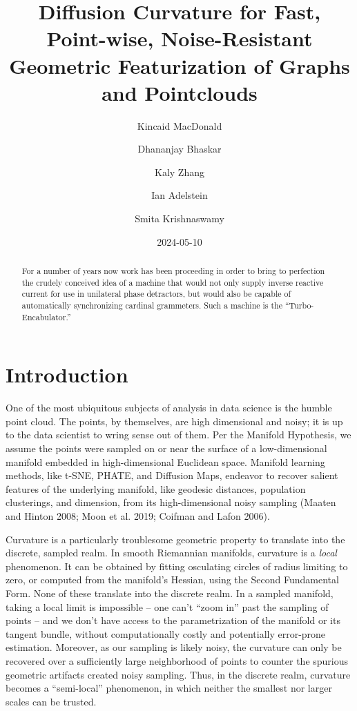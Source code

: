 \documentclass[
  letterpaper,
  DIV=11,
  numbers=noendperiod]{scrartcl}
\title{Diffusion Curvature for Fast, Point-wise, Noise-Resistant
Geometric Featurization of Graphs and Pointclouds}
\author{Kincaid MacDonald \and Dhananjay Bhaskar \and Kaly
Zhang \and Ian Adelstein \and Smita Krishnaswamy}
\date{2024-05-10}
\theoremstyle{plain}
\theoremstyle{plain}
\theoremstyle{definition}
\theoremstyle{definition}
\theoremstyle{remark}
\begin{document}
\maketitle
\begin{abstract}
For a number of years now work has been proceeding in order to bring to
perfection the crudely conceived idea of a machine that would not only
supply inverse reactive current for use in unilateral phase detractors,
but would also be capable of automatically synchronizing cardinal
grammeters. Such a machine is the ``Turbo-Encabulator.''
\end{abstract}

\section{Introduction}\label{introduction}

One of the most ubiquitous subjects of analysis in data science is the
humble point cloud. The points, by themselves, are high dimensional and
noisy; it is up to the data scientist to wring sense out of them. Per
the Manifold Hypothesis, we assume the points were sampled on or near
the surface of a low-dimensional manifold embedded in high-dimensional
Euclidean space. Manifold learning methods, like t-SNE, PHATE, and
Diffusion Maps, endeavor to recover salient features of the underlying
manifold, like geodesic distances, population clusterings, and
dimension, from its high-dimensional noisy sampling (Maaten and Hinton
2008; Moon et al. 2019; Coifman and Lafon 2006).

Curvature is a particularly troublesome geometric property to translate
into the discrete, sampled realm. In smooth Riemannian manifolds,
curvature is a \emph{local} phenomenon. It can be obtained by fitting
osculating circles of radius limiting to zero, or computed from the
manifold's Hessian, using the Second Fundamental Form. None of these
translate into the discrete realm. In a sampled manifold, taking a local
limit is impossible -- one can't ``zoom in'' past the sampling of points
-- and we don't have access to the parametrization of the manifold or
its tangent bundle, without computationally costly and potentially
error-prone estimation. Moreover, as our sampling is likely noisy, the
curvature can only be recovered over a sufficiently large neighborhood
of points to counter the spurious geometric artifacts created noisy
sampling. Thus, in the discrete realm, curvature becomes a
``semi-local'' phenomenon, in which neither the smallest nor larger
scales can be trusted.
\end{document}
